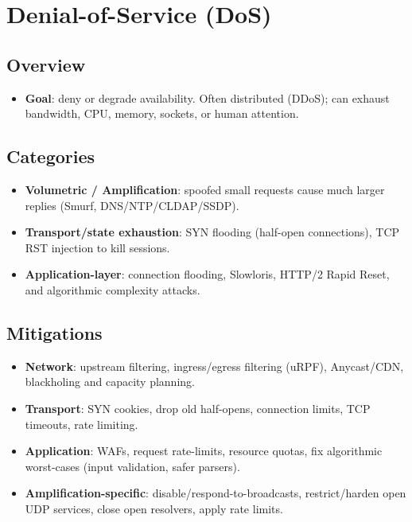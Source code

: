 \documentclass[11pt]{article}
\begin{document}
\section{Denial-of-Service (DoS)}

\subsection{Overview}
\begin{itemize}
  \item \textbf{Goal}: deny or degrade availability. Often distributed (DDoS); can exhaust bandwidth, CPU, memory, sockets, or human attention.
\end{itemize}

\subsection{Categories}
\begin{itemize}
  \item \textbf{Volumetric / Amplification}: spoofed small requests cause much larger replies (Smurf, DNS/NTP/CLDAP/SSDP).
  
  \item \textbf{Transport/state exhaustion}: SYN flooding (half-open connections), TCP RST injection to kill sessions.
  
  \item \textbf{Application-layer}: connection flooding, Slowloris, HTTP/2 Rapid Reset, and algorithmic complexity attacks.
\end{itemize}

\subsection{Mitigations}
\begin{itemize}
  \item \textbf{Network}: upstream filtering, ingress/egress filtering (uRPF), Anycast/CDN, blackholing and capacity planning.
  
  \item \textbf{Transport}: SYN cookies, drop old half-opens, connection limits, TCP timeouts, rate limiting.
  
  \item \textbf{Application}: WAFs, request rate-limits, resource quotas, fix algorithmic worst-cases (input validation, safer parsers).
  
  \item \textbf{Amplification-specific}: disable/respond-to-broadcasts, restrict/harden open UDP services, close open resolvers, apply rate limits.
\end{itemize}
\end{document}
